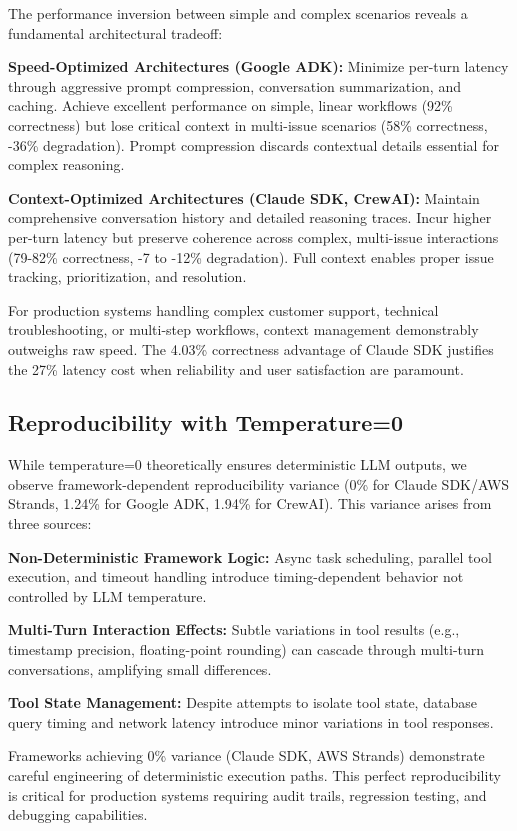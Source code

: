 \documentclass[sigconf,nonacm]{acmart}
\begin{document}
The performance inversion between simple and complex scenarios reveals a fundamental architectural tradeoff:

\textbf{Speed-Optimized Architectures (Google ADK):} Minimize per-turn latency through aggressive prompt compression, conversation summarization, and caching. Achieve excellent performance on simple, linear workflows (92\% correctness) but lose critical context in multi-issue scenarios (58\% correctness, -36\% degradation). Prompt compression discards contextual details essential for complex reasoning.

\textbf{Context-Optimized Architectures (Claude SDK, CrewAI):} Maintain comprehensive conversation history and detailed reasoning traces. Incur higher per-turn latency but preserve coherence across complex, multi-issue interactions (79-82\% correctness, -7 to -12\% degradation). Full context enables proper issue tracking, prioritization, and resolution.

For production systems handling complex customer support, technical troubleshooting, or multi-step workflows, context management demonstrably outweighs raw speed. The 4.03\% correctness advantage of Claude SDK justifies the 27\% latency cost when reliability and user satisfaction are paramount.

\subsection{Reproducibility with Temperature=0}

While temperature=0 theoretically ensures deterministic LLM outputs, we observe framework-dependent reproducibility variance (0\% for Claude SDK/AWS Strands, 1.24\% for Google ADK, 1.94\% for CrewAI). This variance arises from three sources:

\textbf{Non-Deterministic Framework Logic:} Async task scheduling, parallel tool execution, and timeout handling introduce timing-dependent behavior not controlled by LLM temperature.

\textbf{Multi-Turn Interaction Effects:} Subtle variations in tool results (e.g., timestamp precision, floating-point rounding) can cascade through multi-turn conversations, amplifying small differences.

\textbf{Tool State Management:} Despite attempts to isolate tool state, database query timing and network latency introduce minor variations in tool responses.

Frameworks achieving 0\% variance (Claude SDK, AWS Strands) demonstrate careful engineering of deterministic execution paths. This perfect reproducibility is critical for production systems requiring audit trails, regression testing, and debugging capabilities.
\end{document}
